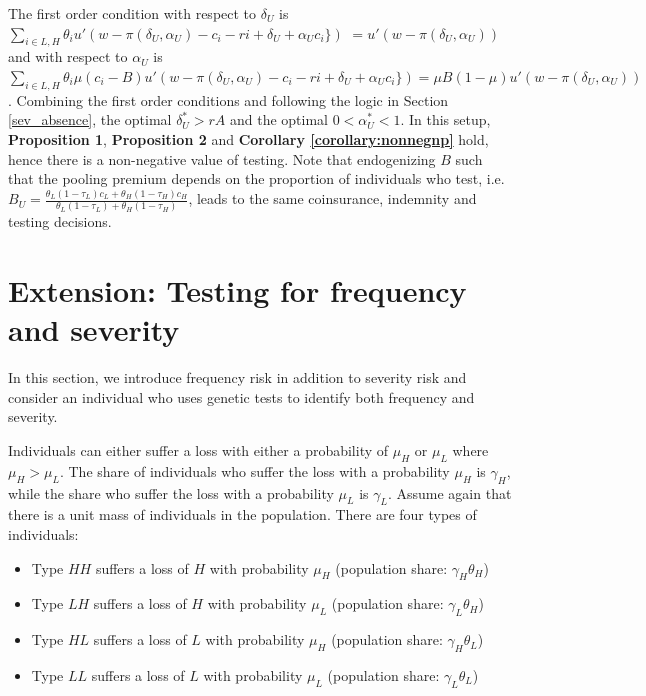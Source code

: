 \documentclass[natbib=false,preprint,12pt]{elsarticle}
\theoremstyle{plain}
\theoremstyle{definition}
\theoremstyle{plain}
\theoremstyle{TheoremNum}
\theoremstyle{CorollaryNum}
\theoremstyle{PropositionNum}
\theoremstyle{TheoremNum}
\begin{document}
The first order condition with respect to $\delta_U$ is $\sum_{i \in {L,H}} \theta_i u'(w-\pi(\delta_U,\alpha_U)-c_i- ri+\delta_U + \alpha_U c_i\})$ $ = u'(w-\pi(\delta_U,\alpha_U))$ and with respect to $\alpha_U$ is $\sum_{i \in {L,H}} \theta_i \mu (c_i - B) u'(w-\pi(\delta_U,\alpha_U)-c_i- ri+\delta_U + \alpha_U c_i\}) = \mu B (1-\mu)u'(w-\pi(\delta_U,\alpha_U))$. Combining the first order conditions and following the logic in Section \ref{sev_absence}, the optimal $\delta_U^* > rA$ and the optimal $0 < \alpha_U^* < 1$. In this setup, \textbf{Proposition 1}, \textbf{Proposition 2} and \textbf{Corollary \ref{corollary:nonnegnp}} hold, hence there is a non-negative value of testing. Note that endogenizing $B$ such that the pooling premium depends on the proportion of individuals who test, i.e. $B_U = \frac{\theta_L (1-\tau_L)c_L + \theta_H(1-\tau_H)c_H}{\theta_L(1-\tau_L) + \theta_H(1-\tau_H)}$, leads to the same coinsurance, indemnity and testing decisions.

\section{Extension: Testing for frequency and severity}

In this section, we introduce frequency risk in addition to severity risk and consider an individual who uses genetic tests to identify both frequency and severity. 

Individuals can either suffer a loss with either a probability of $\mu_H$ or $\mu_L$ where $\mu_H > \mu_L$. The share of individuals who suffer the loss with a probability $\mu_H$ is $\gamma_H$, while the share who suffer the loss with a probability $\mu_L$ is $\gamma_L$. Assume again that there is a unit mass of individuals in the population. There are four types of individuals:

\begin{itemize}
    \item Type $HH$ suffers a loss of $H$ with probability $\mu_H$ (population share: $\gamma_H\theta_H $)
    \item Type $LH$ suffers a loss of $H$ with probability $\mu_L$ (population share: $ \gamma_L\theta_H$)
    \item Type $HL$ suffers a loss of $L$ with probability $\mu_H$ (population share: $\gamma_H\theta_L $)
    \item Type $LL$ suffers a loss of $L$ with probability $\mu_L$ (population share: $\gamma_L\theta_L $)
\end{itemize}
\end{document}
